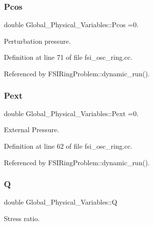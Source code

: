 \subsubsection{\texorpdfstring{Pcos}{Pcos}}
{\footnotesize\ttfamily double Global\+\_\+\+Physical\+\_\+\+Variables\+::\+Pcos =0.}



Perturbation pressure. 



Definition at line 71 of file fsi\+\_\+osc\+\_\+ring.\+cc.



Referenced by F\+S\+I\+Ring\+Problem\+::dynamic\+\_\+run().

\mbox{\label{namespaceGlobal__Physical__Variables_a00f471db241ed712eaefcbaf4fb1d6a9}} 
\subsubsection{\texorpdfstring{Pext}{Pext}}
{\footnotesize\ttfamily double Global\+\_\+\+Physical\+\_\+\+Variables\+::\+Pext =0.}



External Pressure. 



Definition at line 62 of file fsi\+\_\+osc\+\_\+ring.\+cc.



Referenced by F\+S\+I\+Ring\+Problem\+::dynamic\+\_\+run().

\mbox{\label{namespaceGlobal__Physical__Variables_a66cb7ecda9ba0cd72367dd697f154545}} 
\subsubsection{\texorpdfstring{Q}{Q}}
{\footnotesize\ttfamily double Global\+\_\+\+Physical\+\_\+\+Variables\+::Q}



Stress ratio. 



